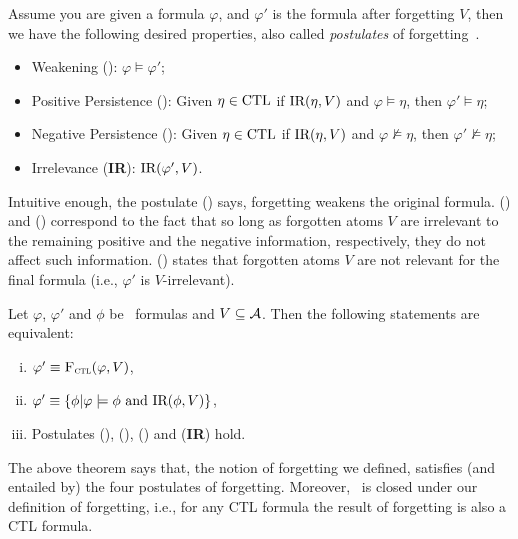 \documentclass{article}
\begin{document}


Assume you are given a formula $\varphi$, and $\varphi'$ is the formula after forgetting $V$, then we have the following desired properties, also called {\em postulates} of forgetting~\cite{Yan:AIJ:2009}.
\begin{itemize}
  \item Weakening (\W): $\varphi \models \varphi'$;
  \item Positive Persistence (\PP):
  Given $\eta \in \textrm{CTL}$ if $\textrm{IR}(\eta, V)$ and $\varphi \models \eta$, then $\varphi' \models \eta$;
  \item Negative Persistence (\NgP):   Given $\eta \in \textrm{CTL}$  if $\textrm{IR}(\eta, V)$ and $\varphi \nvDash \eta$, then $\varphi' \nvDash \eta$;
  \item Irrelevance (\textbf{IR}): $\textrm{IR}(\varphi', V)$.
\end{itemize}


Intuitive enough, the postulate (\W) says, forgetting weakens the original formula.  (\PP)  and  (\NgP) correspond to the fact that so long as forgotten atoms $V$ are irrelevant to the remaining positive and the negative information, respectively, they do not affect such information. (\textbf{\IR}) states that forgotten atoms $V$ are not relevant for the final formula (i.e., $\varphi'$ is $V$-irrelevant).



\begin{theorem}\label{thm:close}
Let $\varphi$, $\varphi'$ and $\phi$ be \CTL\ formulas and $V \subseteq {\cal A}$.
Then the following statements are equivalent:
\begin{enumerate}[(i)]
  \item $\varphi' \equiv {\textsc{F}_{\textsc{ctl}}}(\varphi, V)$,
  \item $\varphi'\equiv \{\phi | \varphi \models \phi \text{ and } \textrm{IR}(\phi, V)\}$,
  \item Postulates (\W), (\PP), (\NgP) and (\textbf{IR}) hold.
\end{enumerate}
\end{theorem}
The above theorem says that, the notion of forgetting  we defined, satisfies (and entailed by) the  four postulates of forgetting. Moreover, \CTL\ is closed under our definition of forgetting, i.e.,  for any CTL formula the result of forgetting is also a CTL formula.
\end{document}
